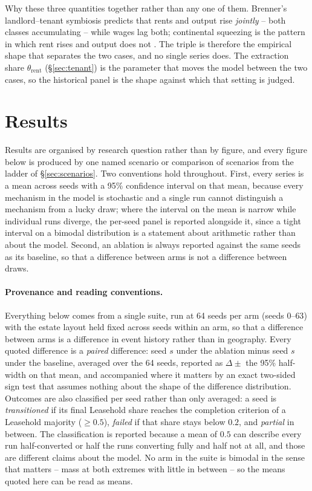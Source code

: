 \documentclass[11pt,english]{article}
\begin{document}
Why these three quantities together rather than any one of them. Brenner's landlord--tenant symbiosis predicts that rents and output rise \emph{jointly} -- both classes accumulating -- while wages lag both; continental squeezing is the pattern in which rent rises and output does not \cite[p.48, p.65]{brenner1976agrarian}. The triple is therefore the empirical shape that separates the two cases, and no single series does. The extraction share $\theta_{\text{rent}}$ (\S\ref{sec:tenant}) is the parameter that moves the model between the two cases, so the historical panel is the shape against which that setting is judged.

\section{Results}
\label{sec:results}

Results are organised by research question rather than by figure, and every figure below is produced by one named scenario or comparison of scenarios from the ladder of \S\ref{sec:scenarios}. Two conventions hold throughout. First, every series is a mean across seeds with a 95\% confidence interval on that mean, because every mechanism in the model is stochastic and a single run cannot distinguish a mechanism from a lucky draw; where the interval on the mean is narrow while individual runs diverge, the per-seed panel is reported alongside it, since a tight interval on a bimodal distribution is a statement about arithmetic rather than about the model. Second, an ablation is always reported against the same seeds as its baseline, so that a difference between arms is not a difference between draws.

\paragraph{Provenance and reading conventions.} Everything below comes from a single suite, run at 64 seeds per arm (seeds $0$--$63$) with the estate layout held fixed across seeds within an arm, so that a difference between arms is a difference in event history rather than in geography. Every quoted difference is a \emph{paired} difference: seed $s$ under the ablation minus seed $s$ under the baseline, averaged over the 64 seeds, reported as $\Delta \pm$ the 95\% half-width on that mean, and accompanied where it matters by an exact two-sided sign test that assumes nothing about the shape of the difference distribution. Outcomes are also classified per seed rather than only averaged: a seed is \emph{transitioned} if its final Leasehold share reaches the completion criterion of a Leasehold majority ($\geq 0.5$), \emph{failed} if that share stays below $0.2$, and \emph{partial} in between. The classification is reported because a mean of $0.5$ can describe every run half-converted or half the runs converting fully and half not at all, and those are different claims about the model. No arm in the suite is bimodal in the sense that matters -- mass at both extremes with little in between -- so the means quoted here can be read as means.
\end{document}
